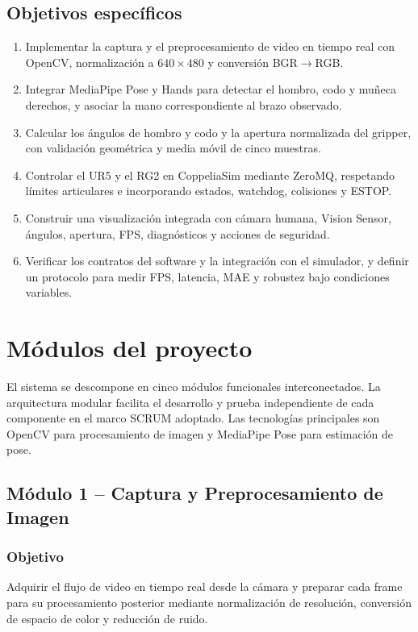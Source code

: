 \subsection{Objetivos específicos}
\begin{enumerate}
    \item Implementar la captura y el preprocesamiento de video en tiempo real
    con OpenCV, normalización a $640\times480$ y conversión BGR$\rightarrow$RGB.
    \item Integrar MediaPipe Pose y Hands para detectar el hombro, codo y muñeca
    derechos, y asociar la mano correspondiente al brazo observado.
    \item Calcular los ángulos de hombro y codo y la apertura normalizada del
    gripper, con validación geométrica y media móvil de cinco muestras.
    \item Controlar el UR5 y el RG2 en CoppeliaSim mediante ZeroMQ, respetando
    límites articulares e incorporando estados, watchdog, colisiones y ESTOP.
    \item Construir una visualización integrada con cámara humana, Vision
    Sensor, ángulos, apertura, FPS, diagnósticos y acciones de seguridad.
    \item Verificar los contratos del software y la integración con el
    simulador, y definir un protocolo para medir FPS, latencia, MAE y robustez
    bajo condiciones variables.
\end{enumerate}

\section{Módulos del proyecto}
El sistema se descompone en cinco módulos funcionales interconectados. La arquitectura modular facilita el desarrollo y prueba independiente de cada componente en el marco SCRUM adoptado. Las tecnologías principales son OpenCV \cite{Bradski2000} para procesamiento de imagen y MediaPipe Pose \cite{Bazarevskyetal2020, 10.1007/978-3-319-10602-1_48} para estimación de pose.

\subsection{Módulo 1 -- Captura y Preprocesamiento de Imagen}

\subsubsection*{Objetivo}
Adquirir el flujo de video en tiempo real desde la cámara y preparar
cada frame para su procesamiento posterior mediante normalización de
resolución, conversión de espacio de color y reducción de ruido.

